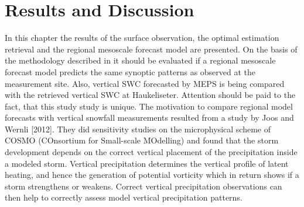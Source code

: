 \chapter{Results and Discussion} \label{ch:Res}
%
In this chapter the results of the surface observation, the optimal estimation retrieval and the regional mesoscale forecast model are presented. On the basis of the methodology described in  it should be evaluated if a regional mesoscale forecast model predicts the same synoptic patterns as observed at the measurement site. Also, vertical SWC forecasted by MEPS is being compared with the retrieved vertical SWC at Haukeliseter. Attention should be paid to the fact, that this study study is unique. The motivation to compare regional model forecasts with vertical snowfall measurements resulted from a study by Joos and Wernli [2012]. They did sensitivity studies on the microphysical scheme of COSMO (COnsortium for Small-scale MOdelling) and found that the storm development depends on the correct vertical placement of the precipitation inside a modeled storm. Vertical precipitation determines the vertical profile of latent heating, and hence the generation of potential vorticity which in return shows if a storm strengthens or weakens. Correct vertical precipitation observations can then help to correctly assess model vertical precipitation patterns.

\newpage
